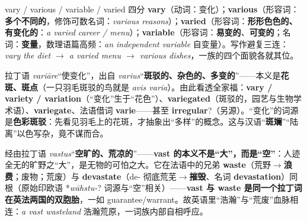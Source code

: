 \documentclass[../main.tex]{subfiles}
\begin{document}
\begin{gram}{vary / various / variable / varied 四分}
\textbf{vary}（动词：变化）；\textbf{various}（形容词：\textbf{多个不同的}，修饰可数名词：\textit{various reasons}）；\textbf{varied}（形容词：\textbf{形形色色的、有变化的}：\textit{a varied career / menu}）；\textbf{variable}（形容词：\textbf{易变的}、\textbf{可变的}；名词：\textbf{变量}，数理语篇高频：\textit{an independent variable} 自变量）。写作避复三连：\textit{vary the diet $\to$ a varied menu $\to$ various dishes}，一族的四个面貌各就其位。
\end{gram}

\begin{origin}
拉丁语 \textit{variāre}“使变化”，出自 \textit{varius}“\textbf{斑驳的、杂色的、多变的}”——本义是\textbf{花斑、斑点}（一只羽毛斑驳的鸟就是 \textit{avis varia}）。由此看透全家福：\textbf{vary / variety / variation}（“变化”生于“花色”）、\textbf{variegated}（斑驳的，园艺与生物学术语）、\textbf{variegate}、法语借词 \textbf{varie}——甚至 \textbf{irregular}?（另源）。“变化”的词源是\textbf{色彩斑驳}：先看见羽毛上的花斑，才抽象出“多样”的概念。这与汉语“\textbf{斑斓}”“陆离”以色写杂，竟不谋而合。
\end{origin}



\begin{origin}
经由拉丁语 \textit{vastus}“\textbf{空旷的、荒凉的}”——\textbf{vast 的本义不是“大”，而是“空”}：人迹全无的旷野之“大”，是无物的可怕之大。它在法语中的兄弟 \textbf{waste}（荒野$\to$\textbf{浪费}；废物；荒废）与 \textbf{devastate}（de- 彻底荒芜$\to$\textbf{摧毁}、名词 \textbf{devastation}）同根（原始印欧语 *\textit{wāhstu-}? 词源与“空”相关）——\textbf{vast 与 waste 是同一个拉丁词在英法两国的双胞胎}，一如 guarantee/warrant。故英语里“浩瀚”与“荒废”血脉相连：\textit{a vast wasteland} 浩瀚荒原，一词族内部自相呼应。
\end{origin}


\end{document}
